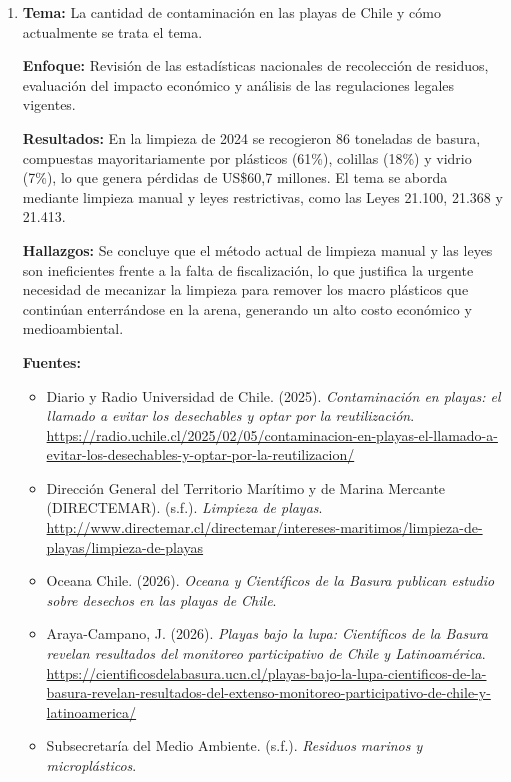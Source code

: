 \documentclass[12pt]{article}
\begin{document}
\begin{enumerate}

\item \textbf{Tema:} La cantidad de contaminación en las playas de Chile y cómo actualmente se trata el tema.

\textbf{Enfoque:} Revisión de las estadísticas nacionales de recolección de residuos, evaluación del impacto económico y análisis de las regulaciones legales vigentes.

\textbf{Resultados:} En la limpieza de 2024 se recogieron 86 toneladas de basura, compuestas mayoritariamente por plásticos (61\%), colillas (18\%) y vidrio (7\%), lo que genera pérdidas de US\$60,7 millones. El tema se aborda mediante limpieza manual y leyes restrictivas, como las Leyes 21.100, 21.368 y 21.413.

\textbf{Hallazgos:} Se concluye que el método actual de limpieza manual y las leyes son ineficientes frente a la falta de fiscalización, lo que justifica la urgente necesidad de mecanizar la limpieza para remover los macro plásticos que continúan enterrándose en la arena, generando un alto costo económico y medioambiental.

\textbf{Fuentes:}
\begin{itemize}
\item Diario y Radio Universidad de Chile. (2025). \textit{Contaminación en playas: el llamado a evitar los desechables y optar por la reutilización}. \url{https://radio.uchile.cl/2025/02/05/contaminacion-en-playas-el-llamado-a-evitar-los-desechables-y-optar-por-la-reutilizacion/}
\item Dirección General del Territorio Marítimo y de Marina Mercante (DIRECTEMAR). (s.f.). \textit{Limpieza de playas}. \url{http://www.directemar.cl/directemar/intereses-maritimos/limpieza-de-playas/limpieza-de-playas}
\item Oceana Chile. (2026). \textit{Oceana y Científicos de la Basura publican estudio sobre desechos en las playas de Chile}.
\item Araya-Campano, J. (2026). \textit{Playas bajo la lupa: Científicos de la Basura revelan resultados del monitoreo participativo de Chile y Latinoamérica}. \url{https://cientificosdelabasura.ucn.cl/playas-bajo-la-lupa-cientificos-de-la-basura-revelan-resultados-del-extenso-monitoreo-participativo-de-chile-y-latinoamerica/}
\item Subsecretaría del Medio Ambiente. (s.f.). \textit{Residuos marinos y microplásticos}.
\end{itemize}


\end{enumerate}
\end{document}
